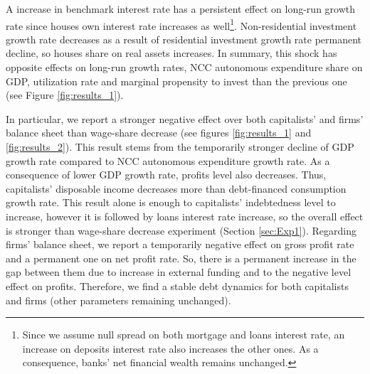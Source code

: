 \documentclass[11pt]{article}
\begin{document}
A increase in benchmark interest rate  has a persistent effect on long-run growth rate since houses own interest rate increases as well\footnote{Since we assume null spread on both mortgage and loans interest rate, an increase on deposits interest rate also increases the other ones. As a consequence, banks' net financial wealth remains unchanged.}.
Non-residential investment growth rate decreases as a result of residential investment growth rate permanent decline, so houses share on real assets increases.
In summary, this shock has opposite effects on long-run growth rates, NCC autonomous expenditure share on GDP, utilization rate and marginal propensity to invest  than the previous one (see Figure \ref{fig:results_1}).


In particular, we report a stronger negative effect over both capitalists' and firms' balance sheet than wage-share decrease (see figures \ref{fig:results_1} and \ref{fig:results_2}).
This result stems from the temporarily stronger decline of GDP growth rate compared to NCC autonomous expenditure growth rate.
As a consequence of lower GDP growth rate, profits level also decreases.
Thus, capitalists' disposable income decreases more than debt-financed consumption growth rate.
This result alone is enough to capitalists' indebtedness level to increase, however it is followed by loans interest rate increase, so the overall effect is stronger than wage-share decrease experiment (Section \ref{sec:Exp1}).
Regarding firms' balance sheet, we report a temporarily negative effect on gross profit rate and a permanent one on net profit rate. 
So, there is a permanent increase in the gap between them due to increase in external funding and to the negative level effect on profits.
Therefore, we find a stable debt dynamics for both capitalists and firms (other parameters remaining unchanged).
\end{document}
